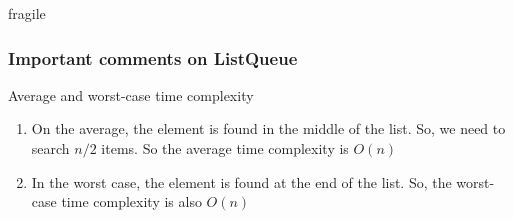 \documentclass{beamer}
\begin{document}
\begin{frame}{fragile}
\frametitle{Important comments on ListQueue}
\begin{block}{Average and worst-case time complexity}
\begin{enumerate}
\item On the average, the element is found in the middle of the list. So, we need to search $n/2$ items. So the average time complexity is $O(n)$
\item In the worst case, the element is found at the end of the list. So, the worst-case time complexity is also $O(n)$
\end{enumerate}
\end{block}

\end{frame}
\end{document}
